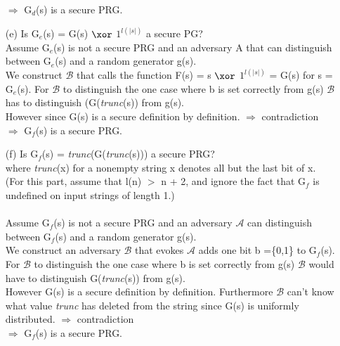 \begin{itemize}
	\(\Rightarrow\) G\(_{d}\)(s) is a secure PRG.
\item[(e)]
	Is G\(_{e}\)(s) = G(s) \(\xor\) \(1^{ l(\vert s \vert)}\) a secure PG? \\
	Assume  G\(_{e}\)(s)  is not a secure PRG and an adversary A that can distinguish between  G\(_{e}\)(s) and a random generator g(s).\\
	We construct \(\mathcal{B}\) that calls the function F(s) = s \(\xor\) \(1^{ l(\vert s \vert)}\) = G(s) for s = G\(_{e}\)(s).
	For \(\mathcal{B}\) to distinguish the one case where b is set correctly from g(s) \(\mathcal{B}\) has to distinguish (G(\textit{trunc}(s)) from g(s).\\
	However since G(s) is a secure definition by definition.
	\(\Rightarrow\)  contradiction\\
	\(\Rightarrow\) G\(_{f}\)(s) is a secure PRG.
\item[(f)]
	Is G\(_{f}\)(s) = \textit{trunc}(G(\textit{trunc}(s))) a secure PRG? \\
	where \textit{trunc}(x) for a nonempty string x denotes all but the last bit of x. \\
	(For this part, assume that l(n) \(>\)  n + 2, and ignore the fact that G\(_{f}\) is undefined on input strings of length 1.) \\
	\\
	Assume G\(_{f}\)(s) is not a secure PRG and an adversary \(\mathcal{A}\) can distinguish between G\(_{f}\)(s) and a random generator g(s).\\
	We construct an adversary \(\mathcal{B}\) that evokes \(\mathcal{A}\) adds one bit b =\{0,1\} to  G\(_{f}\)(s).\\
	For \(\mathcal{B}\) to distinguish the one case where b is set correctly from g(s) \(\mathcal{B}\) would have to distinguish G(\textit{trunc}(s)) from g(s).\\
	However G(s) is a secure definition by definition. Furthermore \(\mathcal{B}\) can't know what value \textit{trunc} has deleted from the string since 		G(s) is uniformly distributed.
	\(\Rightarrow\)  contradiction\\
	\(\Rightarrow\) G\(_{f}\)(s) is a secure PRG.
\end{itemize}
